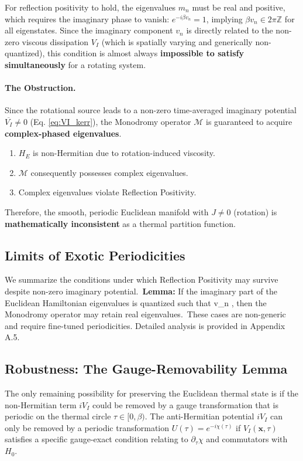 \documentclass[11pt]{article}
\begin{document}
For reflection positivity to hold, the eigenvalues $m_n$ must be real and positive, which requires the imaginary phase to vanish: $e^{-i\beta v_n}=1$, implying $\beta v_n \in 2\pi\mathbb Z$ for all eigenstates. Since the imaginary component $v_n$ is directly related to the non-zero viscous dissipation $V_I$ (which is spatially varying and generically non-quantized), this condition is almost always \textbf{impossible to satisfy simultaneously} for a rotating system.

\paragraph{The Obstruction.}
Since the rotational source leads to a non-zero time-averaged imaginary potential $\overline{V_I} \neq 0$ (Eq. \ref{eq:VI_kerr}), the Monodromy operator $\mathcal{M}$ is guaranteed to acquire \textbf{complex-phased eigenvalues}.

\begin{enumerate}
    \item $H_E$ is non-Hermitian due to rotation-induced viscosity.
    \item $\mathcal{M}$ consequently possesses complex eigenvalues.
    \item Complex eigenvalues violate Reflection Positivity\cite{OsterwalderSchrader1973}.
\end{enumerate}
Therefore, the smooth, periodic Euclidean manifold with $J \neq 0$ (rotation) is \textbf{mathematically inconsistent} as a thermal partition function.

\subsection{Limits of Exotic Periodicities}\label{sec:exotic_periodicities}
We summarize the conditions under which Reflection Positivity may survive despite non-zero imaginary potential.\
\textbf{Lemma:} If the imaginary part of the Euclidean Hamiltonian eigenvalues is quantized such that \beta v_n \pi{}, then the Monodromy operator may retain real eigenvalues.\
These cases are non-generic and require fine-tuned periodicities. Detailed analysis is provided in Appendix A.5.\
\subsection{Robustness: The Gauge-Removability Lemma}

The only remaining possibility for preserving the Euclidean thermal state is if the non-Hermitian term $iV_I$ could be removed by a gauge transformation that is periodic on the thermal circle $\tau \in [0, \beta)$.
The anti-Hermitian potential $iV_I$ can only be removed by a periodic transformation $U(\tau)=e^{-i\chi(\tau)}$ if $V_I(\mathbf{x}, \tau)$ satisfies a specific gauge-exact condition relating to $\partial_\tau\chi$ and commutators with $H_0$.
\end{document}
